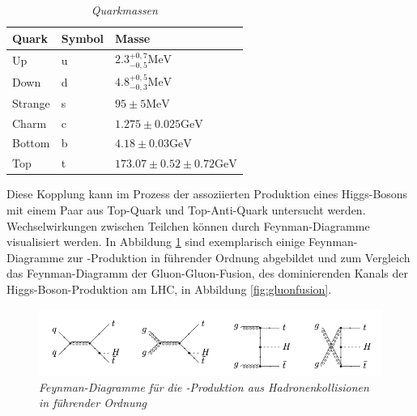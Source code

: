\begin{table}[hhh]\parbox{12cm}{
  \caption[Quarkmassen]{\it\!Quarkmassen {\rm \cite{Agashe:2014kda}}
  }\label{tab:quarkmasse}}
  \begin{center}
  \begin{tabular}{lll}
  \hline
  {\bf Quark} & {\bf Symbol} & {\bf Masse}  \\
  \hline \hline
     Up		& u & $\num{2,3}^{{+0,7}}_{{-0,5}}\si{\mega\electronvolt}$ \\
     Down	& d & $\num{4,8}^{{+0,5}}_{{-0,3}}\si{\mega\electronvolt}$ \\
     Strange& s & $\num{95}\pm \num{5}\si{\mega\electronvolt}$ \\
     Charm	& c & $\num{1,275}\pm \num{0,025}\si{\giga\electronvolt}$ \\ 
  	 Bottom & b & $\num{4,18}\pm \num{0,03}\si{\giga\electronvolt}$ \\
     Top    & t & $\num{173,07}\pm \num{0,52}\pm \num{0,72}\si{\giga\electronvolt}$ \\                                   
  \hline
  \end{tabular}
  \end{center}
\end{table}

Diese Kopplung kann im Prozess der assoziierten Produktion eines Higgs-Bosons mit einem Paar aus Top-Quark und Top-Anti-Quark untersucht werden.\\
Wechselwirkungen zwischen Teilchen k\"onnen durch Feynman-Diagramme visualisiert werden. In Abbildung \ref{fig:ttH_feynmans} sind exemplarisch einige Feynman-Diagramme zur \ttH-Produktion in f\"uhrender Ordnung abgebildet und zum Vergleich das Feynman-Diagramm der Gluon-Gluon-Fusion, des dominierenden Kanals der Higgs-Boson-Produktion am LHC, in Abbildung \ref{fig:gluonfusion}.

\begin{figure}[hhh]
 \begin{center}
   \includegraphics[width=\textwidth]{graphics/ttH_feynmans.png}
   \parbox[b]{12cm}{
     \caption[\ttH Feynman-Diagramme]
             {\label{fig:ttH_feynmans} \it\!Feynman-Diagramme f\"ur die \ttH-Produktion aus Hadronenkollisionen in f\"uhrender Ordnung \cite{hep-ph/0211352}}
   }
 \end{center}
\end{figure}

